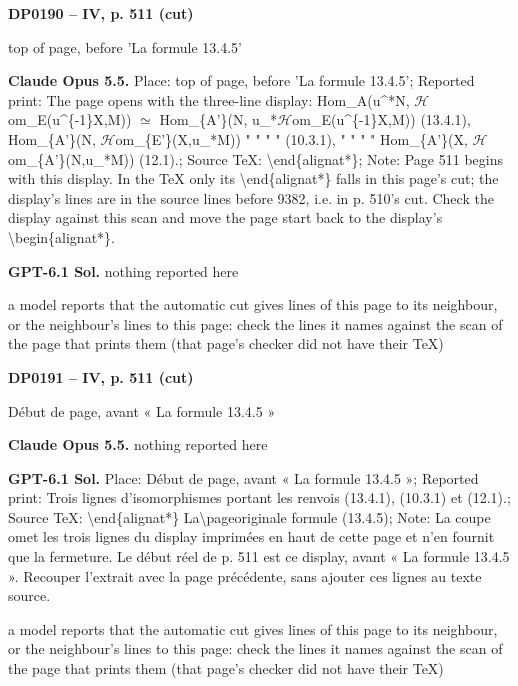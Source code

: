 \par\noindent\hypertarget{DP0190}{}\textbf{DP0190 -- IV, p. 511 (cut)}\par
top of page, before 'La formule 13.4.5'\par
\textbf{Claude Opus 5.5.} Place: top of page, before 'La formule 13.4.5'; Reported print: The page opens with the three-line display: Hom\_A(u\textasciicircum{}*N, \ensuremath{\mathcal{H}}om\_E(u\textasciicircum{}\{-1\}X,M)) \ensuremath{\simeq} Hom\_\{A'\}(N, u\_*\ensuremath{\mathcal{H}}om\_E(u\textasciicircum{}\{-1\}X,M)) (13.4.1), Hom\_\{A'\}(N, \ensuremath{\mathcal{H}}om\_\{E'\}(X,u\_*M)) " " " " (10.3.1), " " " " Hom\_\{A'\}(X, \ensuremath{\mathcal{H}}om\_\{A'\}(N,u\_*M)) (12.1).; Source TeX: \textbackslash{}end\{alignat*\}; Note: Page 511 begins with this display. In the TeX only its \textbackslash{}end\{alignat*\} falls in this page's cut; the display's lines are in the source lines before 9382, i.e. in p. 510's cut. Check the display against this scan and move the page start back to the display's \textbackslash{}begin\{alignat*\}.\par
\textbf{GPT-6.1 Sol.} nothing reported here\par
a model reports that the automatic cut gives lines of this page to its neighbour, or the neighbour's lines to this page: check the lines it names against the scan of the page that prints them (that page's checker did not have their TeX)\par
\par\noindent\hypertarget{DP0191}{}\textbf{DP0191 -- IV, p. 511 (cut)}\par
Début de page, avant « La formule 13.4.5 »\par
\textbf{Claude Opus 5.5.} nothing reported here\par
\textbf{GPT-6.1 Sol.} Place: Début de page, avant « La formule 13.4.5 »; Reported print: Trois lignes d'isomorphismes portant les renvois (13.4.1), (10.3.1) et (12.1).; Source TeX: \textbackslash{}end\{alignat*\} La\textbackslash{}pageoriginale formule (13.4.5); Note: La coupe omet les trois lignes du display imprimées en haut de cette page et n'en fournit que la fermeture. Le début réel de p. 511 est ce display, avant « La formule 13.4.5 ». Recouper l'extrait avec la page précédente, sans ajouter ces lignes au texte source.\par
a model reports that the automatic cut gives lines of this page to its neighbour, or the neighbour's lines to this page: check the lines it names against the scan of the page that prints them (that page's checker did not have their TeX)\par
